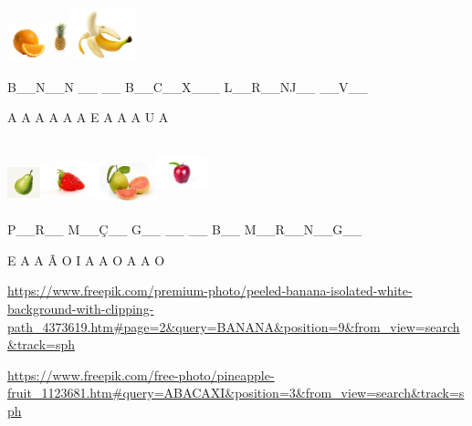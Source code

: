 \includegraphics[width=0.47708in,height=0.42778in]{media/image70.jpeg}\includegraphics[width=0.24167in,height=0.56597in]{media/image71.jpeg}\includegraphics[width=0.74522in,height=0.61494in]{media/image72.jpeg}

B\_\_N\_\_N \_\_ \_\_ B\_\_C\_\_X\_\_\_ L\_\_R\_\_NJ\_\_ \_\_V\_\_

A A A A A A E A A A U A

\includegraphics[width=0.37580in,height=0.49340in]{media/image73.jpeg}\includegraphics[width=0.67500in,height=0.56111in]{media/image74.jpeg}\includegraphics[width=0.64462in,height=0.50955in]{media/image75.jpeg}\includegraphics[width=0.58584in,height=0.73807in]{media/image76.jpeg}

P\_\_R\_\_ M\_\_Ç\_\_ G\_\_ \_\_ \_\_ B\_\_ M\_\_R\_\_N\_\_G\_\_

E A A Ã O I A A O A A O

\url{https://www.freepik.com/premium-photo/peeled-banana-isolated-white-background-with-clipping-path_4373619.htm\#page=2\&query=BANANA\&position=9\&from_view=search\&track=sph}

\url{https://www.freepik.com/free-photo/pineapple-fruit_1123681.htm\#query=ABACAXI\&position=3\&from_view=search\&track=sph}

